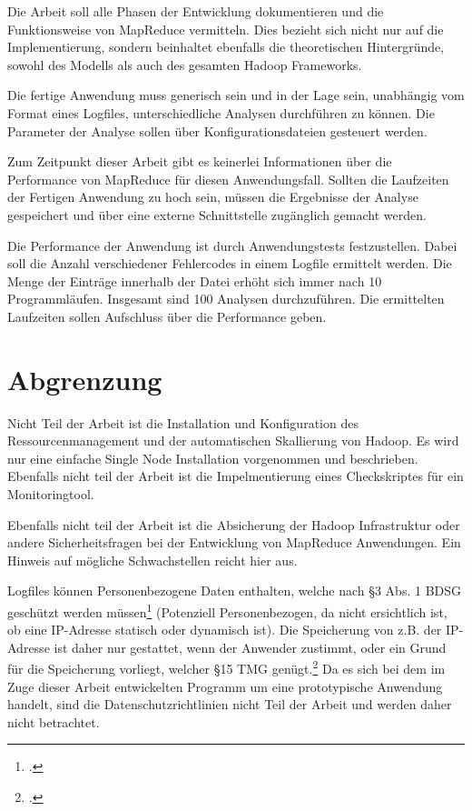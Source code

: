 Die Arbeit soll alle Phasen der Entwicklung dokumentieren und die Funktionsweise von MapReduce vermitteln. Dies bezieht sich nicht nur auf die Implementierung, sondern beinhaltet ebenfalls die theoretischen Hintergründe, sowohl des Modells als auch des gesamten Hadoop Frameworks.

Die fertige Anwendung muss generisch sein und in der Lage sein, unabhängig vom Format eines Logfiles, unterschiedliche Analysen durchführen zu können. Die Parameter der Analyse sollen über Konfigurationsdateien gesteuert werden.

\newpage
Zum Zeitpunkt dieser Arbeit gibt es keinerlei Informationen über die Performance von MapReduce für diesen Anwendungsfall. Sollten die Laufzeiten der Fertigen Anwendung zu hoch sein, müssen die Ergebnisse der Analyse gespeichert und über eine externe Schnittstelle zugänglich gemacht werden.

Die Performance der Anwendung ist durch Anwendungstests festzustellen. Dabei soll die Anzahl verschiedener Fehlercodes in einem Logfile ermittelt werden. Die Menge der Einträge innerhalb der Datei erhöht sich immer nach 10 Programmläufen. Insgesamt sind 100 Analysen durchzuführen. Die ermittelten Laufzeiten sollen Aufschluss über die Performance geben.

\section{Abgrenzung}\label{sec:Abgrenzung}
Nicht Teil der Arbeit ist die Installation und Konfiguration des Ressourcenmanagement und der automatischen Skallierung von Hadoop. Es wird nur eine einfache Single Node Installation vorgenommen und beschrieben. Ebenfalls nicht teil der Arbeit ist die Impelmentierung eines Checkskriptes für ein Monitoringtool.

Ebenfalls nicht teil der Arbeit ist die Absicherung der Hadoop Infrastruktur oder andere Sicherheitsfragen bei der Entwicklung von MapReduce Anwendungen. Ein Hinweis auf mögliche Schwachstellen reicht hier aus.

Logfiles können Personenbezogene Daten enthalten, welche nach §3 Abs. 1 \ac{BDSG} geschützt werden müssen\footcite[§3 Abs. 1 BDSG,][]{BDSG3.1990} (Potenziell Personenbezogen, da nicht ersichtlich ist, ob eine \ac{IP}-Adresse statisch oder dynamisch ist). Die Speicherung von z.B. der \ac{IP}-Adresse ist daher nur gestattet, wenn der Anwender zustimmt, oder ein Grund für die Speicherung vorliegt, welcher §15 \ac{TMG} genügt.\footcite[§15 TMG,][]{TMG15.2007}  Da es sich bei dem im Zuge dieser Arbeit entwickelten Programm um eine prototypische Anwendung handelt, sind die Datenschutzrichtlinien nicht Teil der Arbeit und werden daher nicht betrachtet.


